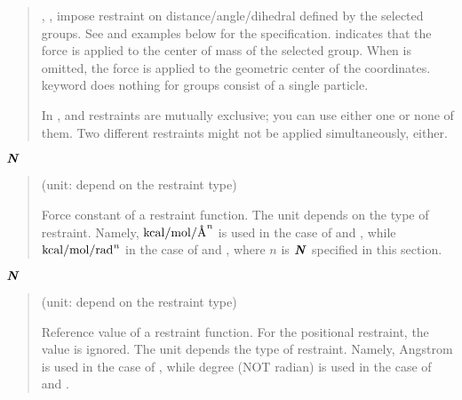 \documentclass[a4paper,11pt,oneside,english]{sphinxmanual}
\begin{document}
\begin{quote}
\begin{itemize}
\end{itemize}

, ,  impose restraint on distance/angle/dihedral
defined by the selected groups. See  and examples
below for the specification.
 indicates that the force is applied to the center of mass of the
selected group.
When  is omitted, the force is applied to the geometric center of
the coordinates.
 keyword does nothing for groups consist of a single particle.

In ,  and  restraints are mutually exclusive;
you can use either one or none of them. Two different  restraints
might not be applied simultaneously, either.

\end{quote}

\(\textbf{\textit{N}}\) 
\begin{quote}

 (unit: depend on the restraint type)

Force constant of a restraint function.
The unit depends on the type of restraint.
Namely, \({\rm{kcal/mol/{\text{\AA}}^{\textit{n}}}}\) is used in the case of  and ,
while \({\rm{kcal/mol/{rad}^{\textit{n}}}}\) in the case of  and ,
where \(n\) is \(\textbf{\textit{N}}\) specified in this section.
\end{quote}

\(\textbf{\textit{N}}\) 
\begin{quote}

 (unit: depend on the restraint type)

Reference value of a restraint function. For the positional restraint, the value is ignored.
The unit depends the type of restraint.
Namely, Angstrom is used in the case of ,
while degree (NOT radian) is used in the case of  and .
\end{quote}
\end{document}
